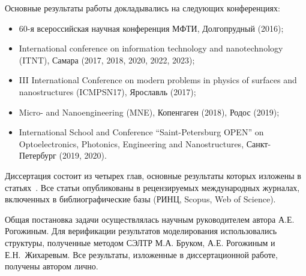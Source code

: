 Основные результаты работы докладывались на следующих конференциях:
\begin{itemize}
	\item 60-я всероссийская научная конференция МФТИ, Долгопрудный (2016);
	\item International conference on information technology and nanotechnology (ITNT), Самара (2017, 2018, 2020, 2022, 2023);
	\item III International Conference on modern problems in physics of surfaces and nanostructures (ICMPSN17), Ярославль (2017);
	\item Micro- and Nanoengineering (MNE), Копенгаген (2018), Родос (2019);
	\item International School and Conference ``Saint-Petersburg OPEN'' on Optoelectronics, Photonics, Engineering and Nanostructures, Санкт-Петербург (2019, 2020).	
\end{itemize}

Диссертация состоит из четырех глав, основные результаты которых изложены в статьях~\cite{my_CO, my_microlenses, my_evidence, my_detailed, my_review_RU, my_MEE, my_Gvalue, my_microscopic, my_Isaev_RU, my_review_2_RU}. Все статьи опубликованы в рецензируемых международных журналах, включенных в библиографические базы (РИНЦ, Scopus, Web of Science).


\contribution
Общая постановка задачи осуществлялась научным руководителем автора \linebreak А.Е. Рогожиным. Для верификации результатов моделирования использовались структуры, полученные методом СЭЛТР М.А. Бруком, А.Е. Рогожиным и Е.Н.~Жихаревым. Все результаты, изложенные в диссертационной работе, получены автором лично.
